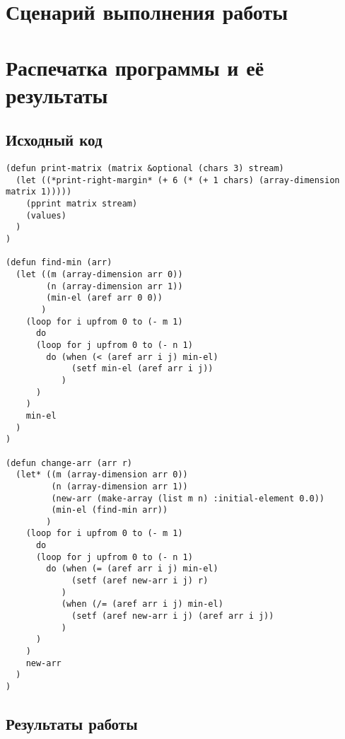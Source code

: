 \documentclass[12pt]{article}
\begin{document}
\section{Сценарий выполнения работы}

\section{Распечатка программы и её результаты}

\subsection{Исходный код}
\begin{lstlisting}
(defun print-matrix (matrix &optional (chars 3) stream)
  (let ((*print-right-margin* (+ 6 (* (+ 1 chars) (array-dimension matrix 1)))))
    (pprint matrix stream)
    (values)
  )
)

(defun find-min (arr)
  (let ((m (array-dimension arr 0))
        (n (array-dimension arr 1))
        (min-el (aref arr 0 0))
       )
    (loop for i upfrom 0 to (- m 1)
      do
      (loop for j upfrom 0 to (- n 1)
        do (when (< (aref arr i j) min-el)
             (setf min-el (aref arr i j))
           )
      )
    )
    min-el
  )
)

(defun change-arr (arr r)
  (let* ((m (array-dimension arr 0))
         (n (array-dimension arr 1))
         (new-arr (make-array (list m n) :initial-element 0.0))
         (min-el (find-min arr))
        )
    (loop for i upfrom 0 to (- m 1)
      do
      (loop for j upfrom 0 to (- n 1)
        do (when (= (aref arr i j) min-el)
             (setf (aref new-arr i j) r)
           )
           (when (/= (aref arr i j) min-el)
             (setf (aref new-arr i j) (aref arr i j))
           )
      )
    )
    new-arr
  )
)

\end{lstlisting}

\subsection{Результаты работы}
\end{document}
